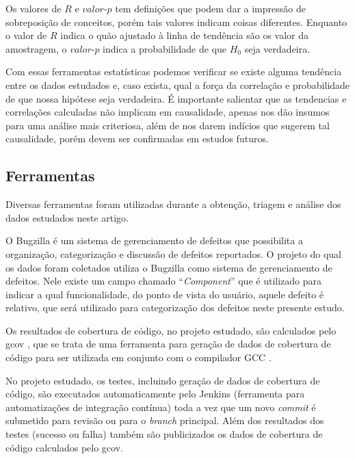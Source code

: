 \documentclass[11.5pt]{article}
\begin{document}
Os valores de $R$ e $valor\mbox{-}p$ tem definições que podem dar a impressão de sobreposição de
conceitos, porém tais valores indicam coisas diferentes.
Enquanto o valor de $R$ indica o quão ajustado à linha de tendência são os valor da amostragem,
o $valor\mbox{-}p$ indica a probabilidade de que $H_0$ seja verdadeira.

Com essas ferramentas estatísticas podemos verificar se existe alguma tendência entre os dados
estudados e, caso exista, qual a força da correlação e probabilidade de que nossa hipótese seja
verdadeira.
É importante salientar que as tendencias e correlações calculadas não implicam em causalidade,
apenas nos dão insumos para uma análise mais criteriosa, além de nos darem indícios que sugerem tal
causalidade, porém devem ser confirmadas em estudos futuros.


\subsection{Ferramentas}

Diversas ferramentas foram utilizadas durante a obtenção, triagem e análise dos dados estudados
neste artigo.

O Bugzilla \cite{bugzilla} é um sistema de gerenciamento de defeitos que possibilita a organização,
categorização e discussão de defeitos reportados.
O projeto do qual os dados foram coletados utiliza o Bugzilla como sistema de gerenciamento de
defeitos. Nele existe um campo chamado ``\textit{Component}'' que é utilizado para indicar a qual
funcionalidade, do ponto de vista do usuário, aquele defeito é relativo, que será utilizado para
categorização dos defeitos neste presente estudo.

Os resultados de cobertura de código, no projeto estudado, são calculados pelo gcov \cite{gcov}, que
se trata de uma ferramenta para geração de dados de cobertura de código para ser utilizada em conjunto
com o compilador GCC \cite{gcc}.

No projeto estudado, os testes, incluindo geração de dados de cobertura de código, são executados
automaticamente pelo Jenkins \cite{jenkins} (ferramenta para automatizações de integração contínua)
toda a vez que um novo \textit{commit} é submetido para revisão ou para o \textit{branch} principal.
Além dos resultados dos testes (sucesso ou falha) também são publicizados os dados de cobertura de
código calculados pelo gcov.
\end{document}

